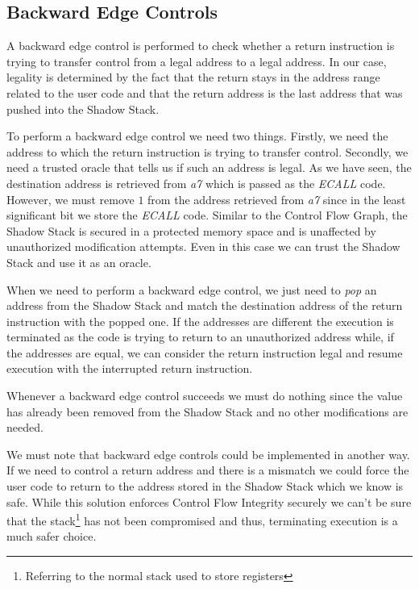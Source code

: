 \subsection{Backward Edge Controls}
\label{subsec:backward}

A backward edge control is performed to check whether a return instruction is
trying to transfer control from a legal address to a legal address. In our case,
legality is determined by the fact that the return stays in the address range
related to the user code and that the return address is the last address that
was pushed into the Shadow Stack.

To perform a backward edge control we need two things. Firstly, we need the
address to which the return instruction is trying to transfer control. Secondly,
we need a trusted oracle that tells us if such an address is legal. As we have seen,
the destination address is retrieved from \textit{a7} which is passed as the \textit{ECALL}
code. However, we must remove $1$ from the address retrieved from \textit{a7} since
in the least significant bit we store the \textit{ECALL} code. Similar to the Control
Flow Graph, the Shadow Stack is secured in a protected memory space and is
unaffected by unauthorized modification attempts. Even in this case we can trust
the Shadow Stack and use it as an oracle.

When we need to perform a backward edge control, we just need to \textit{pop} an
address from the Shadow Stack and match the destination address of the return instruction
with the popped one. If the addresses are different the execution is terminated
as the code is trying to return to an unauthorized address while, if the addresses
are equal, we can consider the return instruction legal and resume execution
with the interrupted return instruction.

Whenever a backward edge control succeeds we must do nothing since the value has
already been removed from the Shadow Stack and no other modifications are needed.

We must note that backward edge controls could be implemented in another way. If
we need to control a return address and there is a mismatch we could force the user
code to return to the address stored in the Shadow Stack which we know is safe.
While this solution enforces Control Flow Integrity securely we can't be sure
that the stack\footnote{Referring to the normal stack used to store registers} has
not been compromised and thus, terminating execution is a much safer choice.

